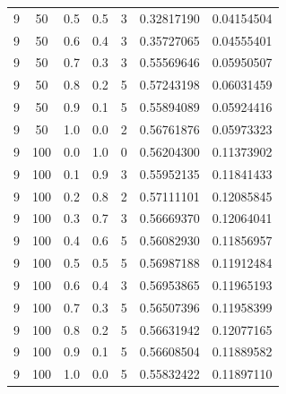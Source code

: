 \documentclass[12pt, a4paper]{report}
\begin{document}
\begin{table} [H]
\begin{tabular}[l]{|c c c c c c c|}
			9 & 50 & 0.5 & 0.5 & 3 & 0.32817190 & 0.04154504 \\
			
			9 & 50 & 0.6 & 0.4 & 3 & 0.35727065 & 0.04555401 \\
			
			9 & 50 & 0.7 & 0.3 & 3 & 0.55569646 & 0.05950507 \\
			
			9 & 50 & 0.8 & 0.2 & 5 & 0.57243198 & 0.06031459 \\
			
			9 & 50 & 0.9 & 0.1 & 5 & 0.55894089 & 0.05924416 \\
			
			9 & 50 & 1.0 & 0.0 & 2 & 0.56761876 & 0.05973323 \\
			
			9 & 100 & 0.0 & 1.0 & 0 & 0.56204300 & 0.11373902 \\
			
			9 & 100 & 0.1 & 0.9 & 3 & 0.55952135 & 0.11841433 \\
			
			9 & 100 & 0.2 & 0.8 & 2 & 0.57111101 & 0.12085845 \\
			
			9 & 100 & 0.3 & 0.7 & 3 & 0.56669370 & 0.12064041 \\
			
			9 & 100 & 0.4 & 0.6 & 5 & 0.56082930 & 0.11856957 \\
			
			9 & 100 & 0.5 & 0.5 & 5 & 0.56987188 & 0.11912484 \\
			
			9 & 100 & 0.6 & 0.4 & 3 & 0.56953865 & 0.11965193 \\
			
			9 & 100 & 0.7 & 0.3 & 5 & 0.56507396 & 0.11958399 \\
			
			9 & 100 & 0.8 & 0.2 & 5 & 0.56631942 & 0.12077165 \\
			
			9 & 100 & 0.9 & 0.1 & 5 & 0.56608504 & 0.11889582 \\
			
			9 & 100 & 1.0 & 0.0 & 5 & 0.55832422 & 0.11897110 \\\hline
		\end{tabular}
	\end{table}
	
\end{document}
